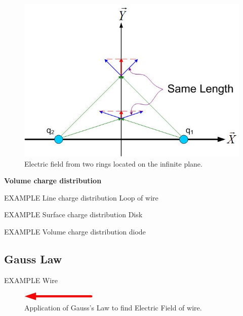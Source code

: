 \documentclass{ximera}
\begin{document}
\begin{figure}[htbp]
\begin{center}
\includegraphics[scale=0.5]{../jpg/constantelectricfieldinfiniteplane.jpg}
\end{center}
\caption{Electric field from two rings located on the infinite plane.}
\label{diskcharge}
\end{figure}





{\bf Volume charge distribution}





{\large EXAMPLE} Line charge distribution Loop of wire

{\large EXAMPLE} Surface charge distribution Disk

{\large EXAMPLE} Volume charge distribution diode


\subsection{Gauss Law}




{\large EXAMPLE} Wire


\begin{figure}[htbp]
\begin{center}
\includegraphics[scale=0.5]{../jpg/gausslawwire.jpg}
\end{center}
\caption{Application of Gauss's Law to find Electric Field of wire.}
\label{GausLine}
\end{figure}
\end{document}
